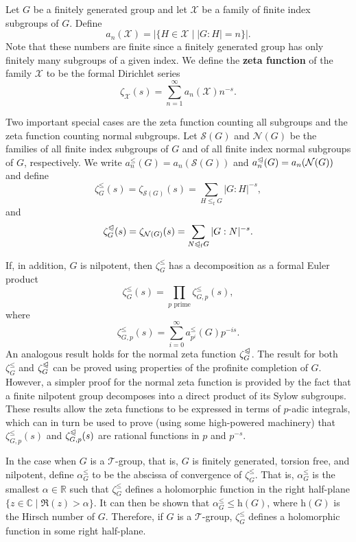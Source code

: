 \documentclass[12pt]{article}
\newcommand{\sgp}{\leqslant}
\newcommand{\sgpf}{\leqslant_{\mathrm{f}}}
\newcommand{\nsgp}{\trianglelefteqslant}
\newcommand{\nsgpf}{\trianglelefteqslant_{\mathrm{f}}}
\newcommand{\hir}{\mathrm{h}}
\begin{document}
Let $G$ be a finitely generated group and let $\mathcal{X}$ be a
family of finite index subgroups of $G$. Define
\[
        a_n(\mathcal{X}) = |\{H \in \mathcal{X} \mid |G : H| = n\}|.
\]
Note that these numbers are finite since a finitely generated group
has only finitely many subgroups of a given index. We define the
\textbf{zeta function} of the family $\mathcal{X}$ to be the formal
Dirichlet series
\[
        \zeta_{\mathcal{X}}(s) = \sum_{n=1}^\infty a_n(\mathcal{X})
        n^{-s}.
\]

Two important special cases are the zeta function counting all
subgroups and the zeta function counting normal subgroups. Let
$\mathcal{S}(G)$ and $\mathcal{N}(G)$ be the families of all finite
index subgroups of $G$ and of all finite index normal subgroups of
$G$, respectively. We write $a_n^\sgp(G) = a_n(\mathcal{S}(G))$ and
$a_n^\nsgp(G) = a_n(\mathcal{N}(G))$ and define
\[
        \zeta_G^\sgp(s) = \zeta_{\mathcal{S}(G)}(s) = \sum_{H \sgpf G}
        |G : H|^{-s},
\]
and
\[
        \zeta_G^\nsgp(s) = \zeta_{\mathcal{N}(G)}(s) = \sum_{N \nsgpf G}
        |G : N|^{-s}.
\]

If, in addition, $G$ is nilpotent, then $\zeta_G^\sgp$ has a
decomposition as a formal Euler product
\[
        \zeta_G^\sgp(s) = \prod_{p \text{ prime}}
        \zeta_{G,p}^\sgp(s),
\]
where
\[
        \zeta_{G,p}^\sgp(s) = \sum_{i=0}^\infty a_{p^i}^\sgp(G)
        p^{-is}.
\]
An analogous result holds for the normal zeta function
$\zeta_G^\nsgp$. The result for both $\zeta_G^\sgp$ and
$\zeta_G^\nsgp$ can be proved using properties of the profinite
completion of $G$. However, a simpler proof for the normal zeta
function is provided by the fact that a finite nilpotent group
decomposes into a direct product of its Sylow subgroups. These results
allow the zeta functions to be expressed in terms of $p$-adic
integrals, which can in turn be used to prove (using some high-powered
machinery) that $\zeta_{G,p}^\sgp(s)$ and $\zeta_{G,p}^\nsgp(s)$ are
rational functions in $p$ and $p^{-s}$.

In the case when $G$ is a $\mathcal{T}$-group, that is, $G$ is
finitely generated, torsion free, and nilpotent, define $\alpha_G^\sgp$
to be the abscissa of convergence of $\zeta_G^\sgp$. That is,
$\alpha_G^\sgp$ is the smallest $\alpha \in \mathbb{R}$ such that
$\zeta_G^\sgp$ defines a holomorphic function in the right half-plane
$\{z \in \mathbb{C} \mid \Re(z) > \alpha\}$. It can then be shown that
$\alpha_G^\sgp \leqslant \hir(G)$, where $\hir(G)$ is the Hirsch number
of $G$. Therefore, if $G$ is a $\mathcal{T}$-group, $\zeta_G^\sgp$
defines a holomorphic function in some right half-plane.
\end{document}
